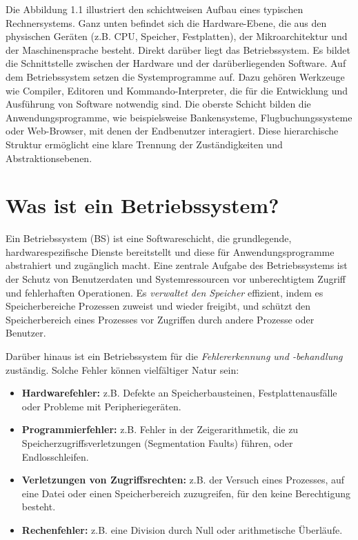 Die Abbildung 1.1 illustriert den schichtweisen Aufbau eines typischen Rechnersystems. Ganz unten befindet sich die Hardware-Ebene, die aus den physischen Geräten (z.B. CPU, Speicher, Festplatten), der Mikroarchitektur und der Maschinensprache besteht. Direkt darüber liegt das Betriebssystem. Es bildet die Schnittstelle zwischen der Hardware und der darüberliegenden Software. Auf dem Betriebssystem setzen die Systemprogramme auf. Dazu gehören Werkzeuge wie Compiler, Editoren und Kommando-Interpreter, die für die Entwicklung und Ausführung von Software notwendig sind. Die oberste Schicht bilden die Anwendungsprogramme, wie beispielsweise Bankensysteme, Flugbuchungssysteme oder Web-Browser, mit denen der Endbenutzer interagiert. Diese hierarchische Struktur ermöglicht eine klare Trennung der Zuständigkeiten und Abstraktionsebenen.

\section{Was ist ein Betriebssystem?}

Ein Betriebssystem (BS) ist eine Softwareschicht, die grundlegende, hardwarespezifische Dienste bereitstellt und diese für Anwendungsprogramme abstrahiert und zugänglich macht. Eine zentrale Aufgabe des Betriebssystems ist der Schutz von Benutzerdaten und Systemressourcen vor unberechtigtem Zugriff und fehlerhaften Operationen. Es \textit{verwaltet den Speicher} effizient, indem es Speicherbereiche Prozessen zuweist und wieder freigibt, und schützt den Speicherbereich eines Prozesses vor Zugriffen durch andere Prozesse oder Benutzer.

Darüber hinaus ist ein Betriebssystem für die \textit{Fehlererkennung und -behandlung} zuständig. Solche Fehler können vielfältiger Natur sein:
\begin{itemize}
\item \textbf{Hardwarefehler:} z.B. Defekte an Speicherbausteinen, Festplattenausfälle oder Probleme mit Peripheriegeräten.
\item \textbf{Programmierfehler:} z.B. Fehler in der Zeigerarithmetik, die zu Speicherzugriffsverletzungen (Segmentation Faults) führen, oder Endlosschleifen.
\item \textbf{Verletzungen von Zugriffsrechten:} z.B. der Versuch eines Prozesses, auf eine Datei oder einen Speicherbereich zuzugreifen, für den keine Berechtigung besteht.
\item \textbf{Rechenfehler:} z.B. eine Division durch Null oder arithmetische Überläufe.
\end{itemize}

